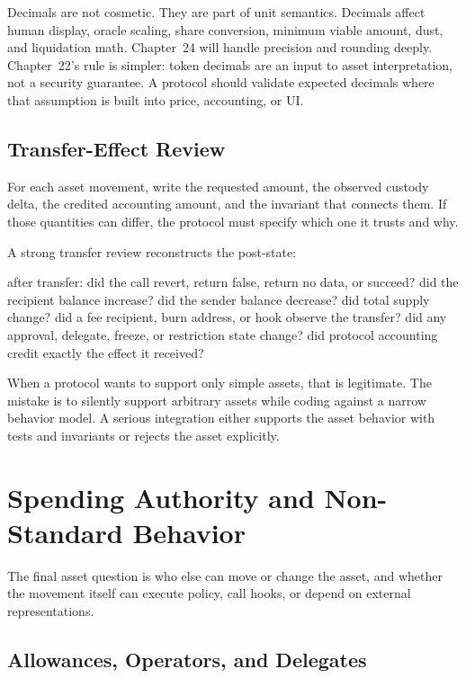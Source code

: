 Decimals are not cosmetic. They are part of unit semantics. Decimals affect human display, oracle scaling, share conversion, minimum viable amount, dust, and liquidation math. Chapter~24 will handle precision and rounding deeply. Chapter~22's rule is simpler: token decimals are an input to asset interpretation, not a security guarantee. A protocol should validate expected decimals where that assumption is built into price, accounting, or UI.

\subsection{Transfer-Effect Review}

\begin{artifactbox}
For each asset movement, write the requested amount, the observed custody delta, the credited accounting amount, and the invariant that connects them. If those quantities can differ, the protocol must specify which one it trusts and why.
\end{artifactbox}

A strong transfer review reconstructs the post-state:

\begin{codeblock}
after transfer:
    did the call revert, return false, return no data, or succeed?
    did the recipient balance increase?
    did the sender balance decrease?
    did total supply change?
    did a fee recipient, burn address, or hook observe the transfer?
    did any approval, delegate, freeze, or restriction state change?
    did protocol accounting credit exactly the effect it received?
\end{codeblock}

When a protocol wants to support only simple assets, that is legitimate. The mistake is to silently support arbitrary assets while coding against a narrow behavior model. A serious integration either supports the asset behavior with tests and invariants or rejects the asset explicitly.

\section{Spending Authority and Non-Standard Behavior}

The final asset question is who else can move or change the asset, and whether the movement itself can execute policy, call hooks, or depend on external representations.

\subsection{Allowances, Operators, and Delegates}

